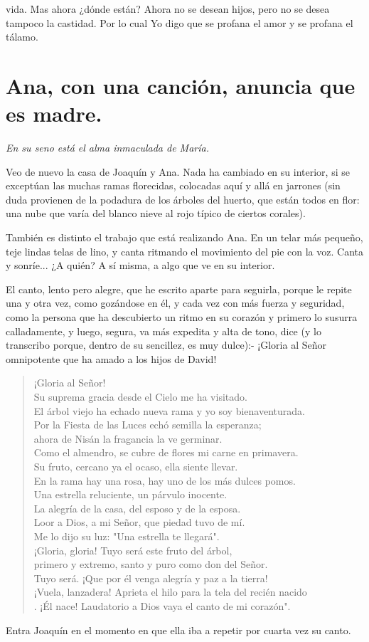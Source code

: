 \documentclass[12pt]{book} %
\begin{document}
vida. Mas ahora ¿dónde están? Ahora no se desean hijos, pero no se desea tampoco la castidad. Por lo cual Yo digo que se profana el amor y se profana el tálamo. 

\chapter{Ana, con una canción, anuncia que es madre.}
\emph{En su seno está el alma inmaculada de María.}
 
Veo de nuevo la casa de Joaquín y Ana. Nada ha cambiado en su interior, si se exceptúan las muchas ramas florecidas, colocadas aquí y allá en jarrones (sin duda provienen de la podadura de los árboles del huerto, que están todos en flor: una nube que varía del blanco nieve al rojo típico de ciertos corales). 

También es distinto el trabajo que está realizando Ana. En un telar más pequeño, teje lindas telas de lino, y canta ritmando el movimiento del pie con la voz. Canta y sonríe... ¿A quién? A sí misma, a algo que ve en su interior. 

El canto, lento pero alegre, que he escrito aparte para seguirla, porque le repite una y otra vez, como gozándose en él, y cada vez con más fuerza y seguridad, como la persona que ha descubierto un ritmo en su corazón y primero lo susurra calladamente, y luego, segura, va más expedita y alta de tono, dice (y lo transcribo porque, dentro de su sencillez, es muy dulce):- ¡Gloria al Señor omnipotente que ha amado a los hijos de David! 

\begin{verse}
¡Gloria al Señor! \\
Su suprema gracia desde el Cielo me ha visitado. \\
El árbol viejo ha echado nueva rama y yo soy bienaventurada. \\
Por la Fiesta de las Luces echó semilla la esperanza; \\
ahora de Nisán la fragancia la ve germinar. \\
Como el almendro, se cubre de flores mi carne en primavera. \\
Su fruto, cercano ya el ocaso, ella siente llevar. \\
En la rama hay una rosa, hay uno de los más dulces pomos. \\
Una estrella reluciente, un párvulo inocente. \\
La alegría de la casa, del esposo y de la esposa. \\
Loor a Dios, a mi Señor, que piedad tuvo de mí. \\
Me lo dijo su luz: "Una estrella te llegará". \\
¡Gloria, gloria! Tuyo será este fruto del árbol, \\
primero y extremo, santo y puro como don del Señor. \\
Tuyo será. ¡Que por él venga alegría y paz a la tierra! \\
¡Vuela, lanzadera! Aprieta el hilo para la tela del recién nacido\\. 
¡Él nace! Laudatorio a Dios vaya el canto de mi corazón". 
\end{verse}
Entra Joaquín en el momento en que ella iba a repetir por cuarta vez su canto. 
\end{document}

